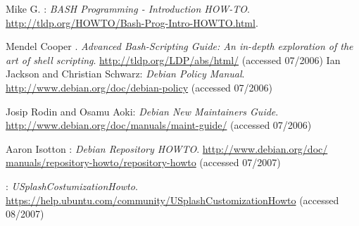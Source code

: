 
\bigskip{\par}
\backmatter
{}
\begin{thebibliography}{99}
 Mike G. : \newblock \emph{BASH %
	Programming - Introduction HOW-TO}. \href{http://tldp.org/HOWTO/Bash-Prog%
	-Intro-HOWTO.html}{http://tldp.org/HOWTO/Bash-Prog-Intro-HOWTO.html}.

 Mendel Cooper . \newblock
	\emph{Advanced Bash-Scripting Guide: An in-depth exploration of the %
	art of shell scripting}. \href{http://tldp.org/LDP/abs/html/}%
	{http://tldp.org/LDP/abs/html/} (accessed 07/2006)
 Ian Jackson and Christian Schwarz: \newblock
	\emph{Debian Policy Manual}.
	\href{http://www.debian.org/doc/debian-policy}%
	{http://www.debian.org/doc/debian-policy} (accessed 07/2006)

 Josip Rodin and Osamu Aoki: \newblock
	\emph{Debian New Maintainers Guide}.
	\href{http://www.debian.org/doc/manuals/maint-guide/}%
	{http://www.debian.org/doc/manuals/maint-guide/} (accessed 07/2006)

 Aaron Isotton :
	\newblock \emph{Debian Repository HOWTO}. \href{http://www.debian.org/doc/%
	manuals/repository-howto/repository-howto}{http://www.debian.org/doc/%
	manuals/repository-howto/repository-howto} (accessed 07/2007)

:
	\emph{USplashCostumizationHowto}.
	\href{https://help.ubuntu.com/community/USplashCustomizationHowto}
		{https://help.ubuntu.com/community/USplashCustomizationHowto}
	(accessed 08/2007)

\end{thebibliography}
